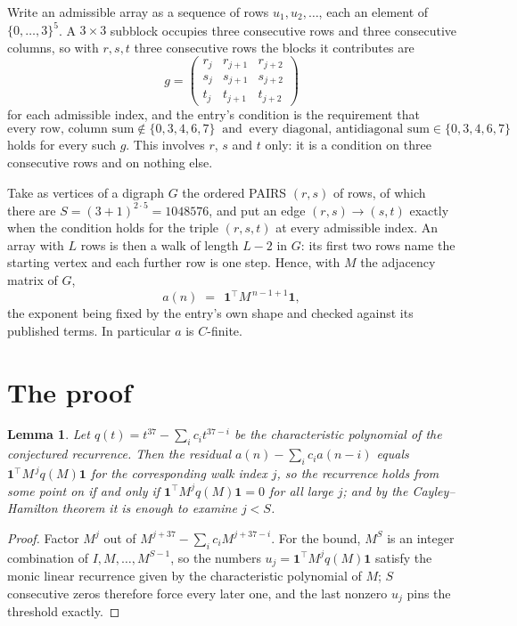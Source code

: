 \documentclass[11pt,a4paper]{article}
\theoremstyle{plain}
\newtheorem{lemma}[theorem]{Lemma}
\theoremstyle{definition}
\begin{document}
Write an admissible array as a sequence of rows $u_1,u_2,\dots$, each an element of
$\{0,\dots,3\}^{5}$. A $3\times3$ subblock occupies three consecutive rows and
three consecutive columns, so with $r,s,t$ three consecutive rows the blocks it
contributes are
\[
g=\begin{pmatrix}r_j&r_{j+1}&r_{j+2}\\ s_j&s_{j+1}&s_{j+2}\\ t_j&t_{j+1}&t_{j+2}\end{pmatrix}
\]
for each admissible index, and the entry's condition is the requirement that
\[
\text{every row, column sum} \notin \{0,3,4,6,7\}\ \text{ and }\ \text{every diagonal, antidiagonal sum} \in \{0,3,4,6,7\}
\]
holds for every such $g$. This involves $r$, $s$ and $t$ only: it is a condition on
three consecutive rows and on nothing else.

Take as vertices of a digraph $G$ the ordered PAIRS $(r,s)$ of rows, of which there are
$S=(3+1)^{2\cdot5}=1048576$, and put an edge $(r,s)\to(s,t)$ exactly when the condition
holds for the triple $(r,s,t)$ at every admissible index. An array with $L$ rows is then a
walk of length $L-2$ in $G$: its first two rows name the starting vertex and each further
row is one step. Hence, with $M$ the adjacency matrix of $G$,
\[
a(n)\;=\;\,\mathbf{1}^{\!\top}M^{\,n-1+1}\mathbf{1},
\]
the exponent being fixed by the entry's own shape and checked against its published terms.
In particular $a$ is $C$-finite.

\section{The proof}

\begin{lemma}\label{lem:crit}
Let $q(t)=t^{37}-\sum_i c_it^{37-i}$ be the characteristic polynomial of the
conjectured recurrence. Then the residual $a(n)-\sum_ic_ia(n-i)$ equals
$\mathbf{1}^{\!\top}M^{\,j}q(M)\mathbf{1}$ for the corresponding walk index
$j$, so the recurrence holds from some point on if and only if
$\mathbf{1}^{\!\top}M^{j}q(M)\mathbf{1}=0$ for all large $j$; and by the
Cayley--Hamilton theorem it is enough to examine $j<S$.
\end{lemma}

\begin{proof}
Factor $M^{j}$ out of $M^{j+37}-\sum_ic_iM^{j+37-i}$. For the bound, $M^{S}$
is an integer combination of $I,M,\dots,M^{S-1}$, so the numbers
$u_j=\mathbf{1}^{\!\top}M^{j}q(M)\mathbf{1}$ satisfy the monic linear recurrence given by
the characteristic polynomial of $M$; $S$ consecutive zeros therefore force every later one,
and the last nonzero $u_j$ pins the threshold exactly.
\end{proof}
\end{document}
